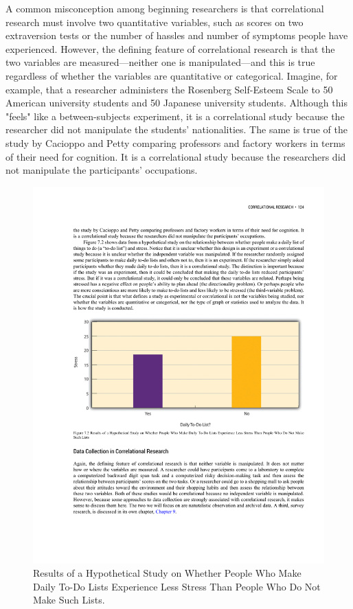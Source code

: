A common misconception among beginning researchers is that correlational research must involve two quantitative variables, such as scores on two extraversion tests or the number of hassles and number of symptoms people have experienced. However, the defining feature of correlational research is that the two variables are measured---neither one is manipulated---and this is true regardless of whether the variables are quantitative or categorical. Imagine, for example, that a researcher administers the Rosenberg Self-Esteem Scale to 50 American university students and 50 Japanese university students. Although this "feels" like a between-subjects experiment, it is a correlational study because the researcher did not manipulate the students' nationalities. The same is true of the study by Cacioppo and Petty comparing professors and factory workers in terms of their need for cognition. It is a correlational study because the researchers did not manipulate the participants' occupations.

\begin{figure}
\includegraphics[width=\linewidth]{figures/C7daily.pdf}
\caption{Results of a Hypothetical Study on Whether People Who Make Daily To-Do Lists Experience Less Stress Than People Who Do Not Make Such Lists.
}
\label{fig:daily}
\end{figure}

